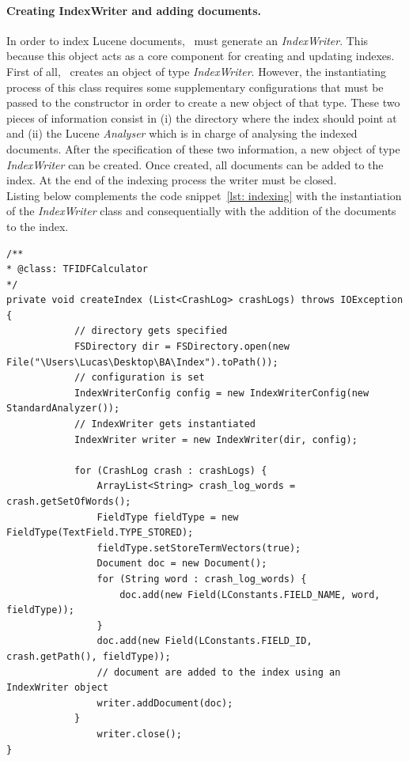 \paragraph{Creating IndexWriter and adding documents.}
In order to index Lucene documents, \toolname\ must generate an \textit{IndexWriter}. This because this object acts as a core component for creating and updating indexes. 
First of all, \toolname\ creates an object of type \textit{IndexWriter}. However, the instantiating process of this class requires some supplementary configurations that must be passed to the constructor in order to create a new object of that type. 
These two pieces of information consist in (i) the directory where the index should point at and (ii) the Lucene \textit{Analyser} which is in charge of analysing the indexed documents. 
After the specification of these two information, a new object of type \textit{IndexWriter} can be created. 
Once created, all documents can be added to the index. At the end of the indexing process the writer must be closed.\\
Listing below complements the code snippet~\ref{lst: indexing} with the instantiation of the \textit{IndexWriter} class and consequentially with the addition of the documents to the index.  
\begin{lstlisting}[caption=\TFIDF\ describing the instantiation of an IndexWriter,label={lst: indexwriter}]
/**
* @class: TFIDFCalculator
*/
private void createIndex (List<CrashLog> crashLogs) throws IOException {
			// directory gets specified
		    FSDirectory dir = FSDirectory.open(new File("\Users\Lucas\Desktop\BA\Index").toPath());
		    // configuration is set
            IndexWriterConfig config = new IndexWriterConfig(new StandardAnalyzer());
            // IndexWriter gets instantiated 
            IndexWriter writer = new IndexWriter(dir, config);
	
            for (CrashLog crash : crashLogs) {
                ArrayList<String> crash_log_words = crash.getSetOfWords();
                FieldType fieldType = new FieldType(TextField.TYPE_STORED); 
                fieldType.setStoreTermVectors(true); 
                Document doc = new Document(); 
                for (String word : crash_log_words) {
                    doc.add(new Field(LConstants.FIELD_NAME, word, fieldType)); 
                }
                doc.add(new Field(LConstants.FIELD_ID, crash.getPath(), fieldType));
                // document are added to the index using an IndexWriter object
                writer.addDocument(doc);
   			}
                writer.close();
}
    
\end{lstlisting} 
